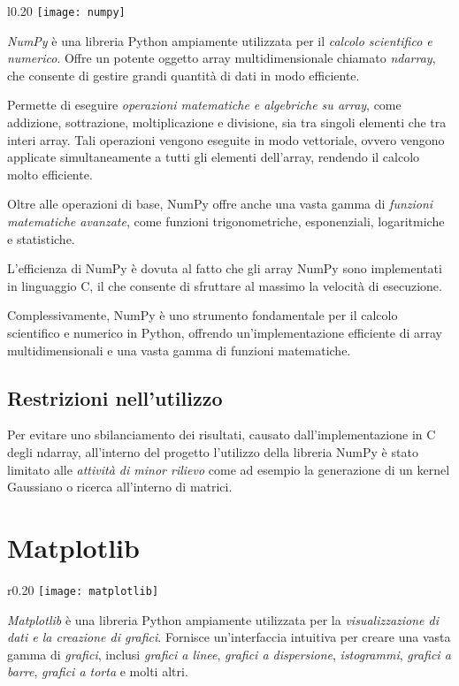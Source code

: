 {{{{	\begin{wrapfigure}{l}{0.20\textwidth}
		\centering
		\texttt{[image: numpy]}
	\end{wrapfigure}
	\textit{NumPy} è una libreria Python ampiamente utilizzata per il \textit{calcolo scientifico e numerico}. Offre un potente oggetto array multidimensionale chiamato \textit{ndarray}, che consente di gestire grandi quantità di dati in modo efficiente.
	
	Permette di eseguire \textit{operazioni matematiche e algebriche su array}, come addizione, sottrazione, moltiplicazione e divisione, sia tra singoli elementi che tra interi array. Tali operazioni vengono eseguite in modo vettoriale, ovvero vengono applicate simultaneamente a tutti gli elementi dell'array, rendendo il calcolo molto efficiente.
	
	Oltre alle operazioni di base, NumPy offre anche una vasta gamma di \textit{funzioni matematiche avanzate}, come funzioni trigonometriche, esponenziali, logaritmiche e statistiche. 
	
	L'efficienza di NumPy è dovuta al fatto che gli array NumPy sono implementati in linguaggio C, il che consente di sfruttare al massimo la velocità di esecuzione.
	
	Complessivamente, NumPy è uno strumento fondamentale per il calcolo scientifico e numerico in Python, offrendo un'implementazione efficiente di array multidimensionali e una vasta gamma di funzioni matematiche.
	
\subsection{Restrizioni nell'utilizzo}
Per evitare uno sbilanciamento dei risultati, causato dall'implementazione in C degli ndarray, all'interno del progetto l'utilizzo della libreria NumPy è stato limitato alle \textit{attività di minor rilievo} come ad esempio la generazione di un kernel Gaussiano o ricerca all'interno di matrici. 
	
{\section{Matplotlib}
	
	\begin{wrapfigure}{r}{0.20\textwidth}
		\centering
		\texttt{[image: matplotlib]}
	\end{wrapfigure}
\textit{Matplotlib} è una libreria Python ampiamente utilizzata per la \textit{visualizzazione di dati e la creazione di grafici}. Fornisce un'interfaccia intuitiva per creare una vasta gamma di \textit{grafici}, inclusi \textit{grafici a linee}, \textit{grafici a dispersione}, \textit{istogrammi}, \textit{grafici a barre}, \textit{grafici a torta} e molti altri.

}}}}}
